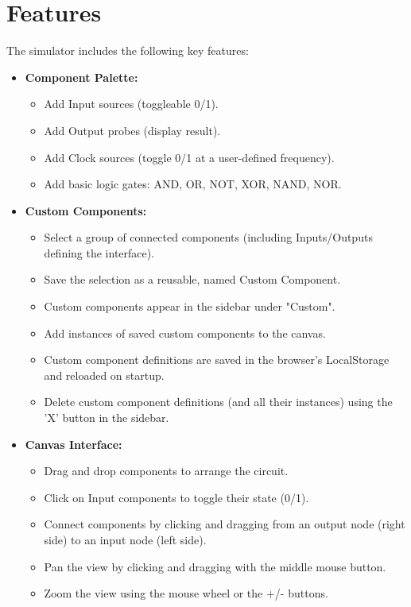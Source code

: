 \documentclass[11pt, a4paper]{article}
\begin{document}
\section{Features}
The simulator includes the following key features:
\begin{itemize}[leftmargin=*]
    \item \textbf{Component Palette:}
    \begin{itemize}
        \item Add Input sources (toggleable 0/1).
        \item Add Output probes (display result).
        \item Add Clock sources (toggle 0/1 at a user-defined frequency).
        \item Add basic logic gates: AND, OR, NOT, XOR, NAND, NOR.
    \end{itemize}
    \item \textbf{Custom Components:}
    \begin{itemize}
        \item Select a group of connected components (including Inputs/Outputs defining the interface).
        \item Save the selection as a reusable, named Custom Component.
        \item Custom components appear in the sidebar under "Custom".
        \item Add instances of saved custom components to the canvas.
        \item Custom component definitions are saved in the browser's LocalStorage and reloaded on startup.
        \item Delete custom component definitions (and all their instances) using the 'X' button in the sidebar.
    \end{itemize}
    \item \textbf{Canvas Interface:}
    \begin{itemize}
        \item Drag and drop components to arrange the circuit.
        \item Click on Input components to toggle their state (0/1).
        \item Connect components by clicking and dragging from an output node (right side) to an input node (left side).
        \item Pan the view by clicking and dragging with the middle mouse button.
        \item Zoom the view using the mouse wheel or the +/- buttons.

\end{itemize}
\end{itemize}
\end{document}
